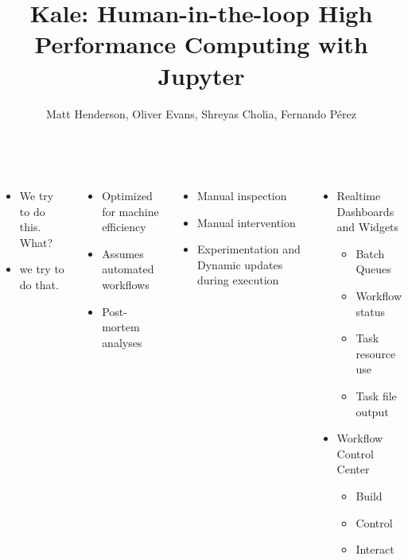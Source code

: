 \documentclass{tikzposter}
\author{Matt Henderson, Oliver Evans, Shreyas Cholia, Fernando P\'{e}rez}
\title{Kale: Human-in-the-loop High Performance Computing with Jupyter}
\institute{Lawrence Berkeley National Laboratory}
\begin{document}
\maketitle


\begin{columns}

 {
    \begin{itemize}
        \item We try to do this. What?
        \item we try to do that.
    \end{itemize}
}

 {
    \begin{itemize}
        \item Optimized for machine efficiency
        \item Assumes automated workflows
        \item Post-mortem analyses
    \end{itemize}
}

 {
    \begin{itemize}
        \item Manual inspection
        \item Manual intervention
        \item Experimentation and Dynamic updates during execution
    \end{itemize}
}

 {
    \begin{itemize}
        \item Realtime Dashboards and Widgets
        \begin{itemize}
            \item Batch Queues
            \item Workflow status
            \item Task resource use
            \item Task file output
        \end{itemize}
        \item Workflow Control Center
        \begin{itemize}
            \item Build
            \item Control
            \item Interact
        \end{itemize}
    \end{itemize}
}    


\end{columns}
\end{document}
